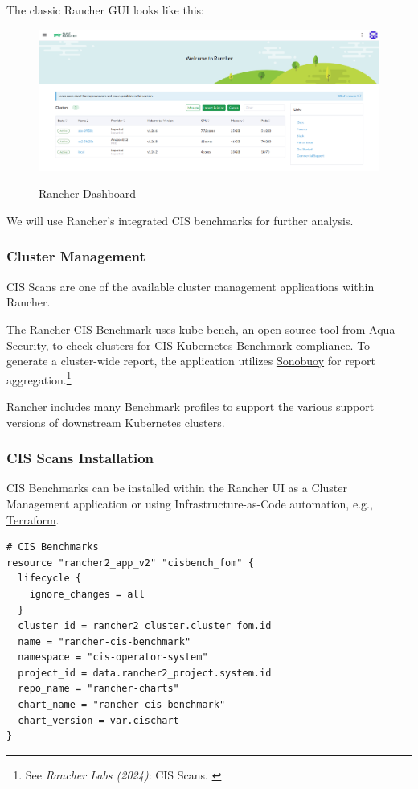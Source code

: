 The classic Rancher GUI looks like this:

\begin{figure}[H]
\centering
\caption {Rancher Dashboard}
\includegraphics[width=\linewidth]{images/rancher-dashboard.png}
\label{fig:rancherDashboard}
\end{figure}

We will use Rancher's integrated CIS benchmarks for further analysis.

\subsubsection{Cluster Management}

CIS Scans are one of the available cluster management applications within Rancher.

The Rancher CIS Benchmark uses \href{https://github.com/aquasecurity/kube-bench}{kube-bench}, an open-source tool from \href{https://www.aquasec.com/}{Aqua Security}, to check clusters for CIS Kubernetes Benchmark compliance. To generate a cluster-wide report, the application utilizes \href{https://sonobuoy.io/}{Sonobuoy} for report aggregation.\footnote{See \textit{Rancher Labs (2024)}: CIS Scans. \cite{rancherBenchmarks}}

Rancher includes many Benchmark profiles to support the various support versions of downstream Kubernetes clusters.

\subsubsection{CIS Scans Installation}

CIS Benchmarks can be installed within the Rancher UI as a Cluster Management application or using Infrastructure-as-Code automation, e.g., \href{https://www.terraform.io/}{Terraform}.

\begin{lstlisting}[caption=Installing CIS Benchmarks, frame=single, basicstyle=\ttfamily]
# CIS Benchmarks
resource "rancher2_app_v2" "cisbench_fom" {
  lifecycle {
    ignore_changes = all
  }
  cluster_id = rancher2_cluster.cluster_fom.id
  name = "rancher-cis-benchmark"
  namespace = "cis-operator-system"
  project_id = data.rancher2_project.system.id
  repo_name = "rancher-charts"
  chart_name = "rancher-cis-benchmark"
  chart_version = var.cischart
}
\end{lstlisting}


